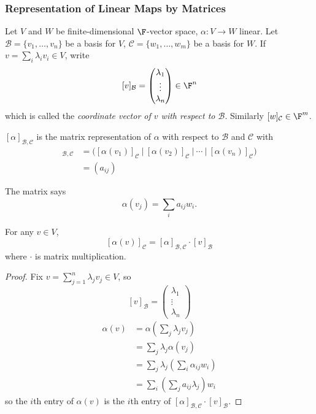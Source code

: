 \documentclass[a4paper]{article}
\newcommand*{\basis}{\mathcal}
\theoremstyle{definition}
\begin{document}
\subsubsection{Representation of Linear Maps by Matrices}

Let \(V\) and \(W\) be finite-dimensional \(\F\)-vector space, \(\alpha: V\to W\) linear. Let \(\basis B = \{v_1,\ldots,v_n\}\) be a basis for \(V\), \(\basis C = \{w_1,\ldots,w_m\}\) be a basis for \(W\). If \(v=\sum_{i}\lambda_iv_i \in V\), write
\[
[v]_{\basis B} =
\begin{pmatrix}
  \lambda_1 \\
  \vdots \\
  \lambda_n
\end{pmatrix}
\in \F^n
\]
which is called the \emph{coordinate vector of \(v\) with respect to \(\basis B\)}. Similarly \([w]_{\basis C}\in \F^m\).

\begin{definition}
  \([\alpha]_{\basis B, \basis C}\) is the matrix representation of \(\alpha\) with respect to \(\basis B\) and \(\basis C\) with
  \begin{align*}
    [\alpha]_{\basis B, \basis C} &= \Big( [\alpha(v_1)]_{\basis C} \: \Big| \: [\alpha(v_2)]_{\basis C} \: \Big | \: \cdots \: \Big| \: [\alpha(v_n)]_{\basis C} \Big) \\
                                  &= (a_{ij})
  \end{align*}
\end{definition}

The matrix says
\[
  \alpha(v_j) = \sum_{i}^{ }a_{ij}w_i.
\]

\begin{lemma}
  For any \(v\in V\),
  \[
[\alpha(v)]_{\basis C} = [\alpha]_{\basis B, \basis C}\cdot [v]_{\basis B}
  \]
  where \(\cdot\) is matrix multiplication.
\end{lemma}

\begin{proof}
  Fix \(v =\sum_{j=1}^{n}\lambda_jv_j \in V\), so
  \[
[v]_{\basis B} =
\begin{pmatrix}
  \lambda_1 \\
  \vdots \\
  \lambda_n
\end{pmatrix}
\]
\begin{align*}
  \alpha(v) &= \alpha\left( \sum_{j}^{ }\lambda_jv_j \right) \\
            &= \sum_{j}^{ }\lambda_j\alpha(v_j) \\
            &= \sum_{j}^{ }\lambda_j\left( \sum_{i}^{ }\alpha_{ij}w_i \right) \\
            &= \sum_{i}^{ }\left( \sum_{j}^{} a_{ij}\lambda_j \right) w_i
\end{align*}
so the \(i\)th entry of \(\alpha(v)\) is the \(i\)th entry of \([\alpha]_{\basis B, \basis C} \cdot [v]_{\basis B}\).
\end{proof}
\end{document}
